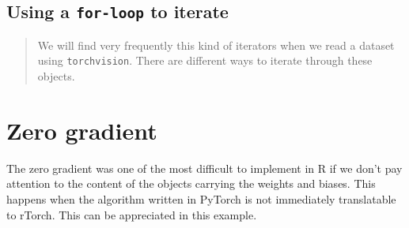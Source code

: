 \documentclass[]{book}
\newenvironment{Shaded}{\begin{snugshade}}{\end{snugshade}}
\newcommand{\CharTok}[1]{\textcolor[rgb]{0.31,0.60,0.02}{#1}}
\newcommand{\CommentTok}[1]{\textcolor[rgb]{0.56,0.35,0.01}{\textit{#1}}}
\newcommand{\ControlFlowTok}[1]{\textcolor[rgb]{0.13,0.29,0.53}{\textbf{#1}}}
\newcommand{\DecValTok}[1]{\textcolor[rgb]{0.00,0.00,0.81}{#1}}
\newcommand{\KeywordTok}[1]{\textcolor[rgb]{0.13,0.29,0.53}{\textbf{#1}}}
\newcommand{\NormalTok}[1]{#1}
\newcommand{\OperatorTok}[1]{\textcolor[rgb]{0.81,0.36,0.00}{\textbf{#1}}}
\newcommand{\StringTok}[1]{\textcolor[rgb]{0.31,0.60,0.02}{#1}}
\begin{document}
\hypertarget{using-a-for-loop-to-iterate}{%
\subsection{\texorpdfstring{Using a \texttt{for-loop} to iterate}{Using a for-loop to iterate}}\label{using-a-for-loop-to-iterate}}

\begin{Shaded}
\end{Shaded}

\begin{quote}
We will find very frequently this kind of iterators when we read a dataset using \texttt{torchvision}. There are different ways to iterate through these objects.
\end{quote}

\hypertarget{zero-gradient}{%
\section{Zero gradient}\label{zero-gradient}}

The zero gradient was one of the most difficult to implement in R if we don't pay attention to the content of the objects carrying the weights and biases. This happens when the algorithm written in PyTorch is not immediately translatable to rTorch. This can be appreciated in this example.
\end{document}
